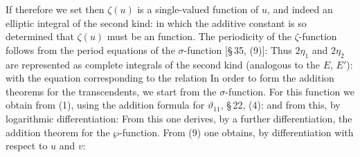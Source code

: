 
If therefore we set
then $\zeta(u)$ is a single-valued function of $u$, and indeed
an elliptic integral of the second kind:
in which the additive constant is so determined that $\zeta(u)$
must be an  function. The periodicity of the $\zeta$-function
follows from the period equations of the $\sigma$-function
[\S\,35, (9)]:
Thus $2\eta_1$ and $2\eta_2$ are represented as complete integrals of the second
kind (analogous to the $E$, $E'$):
with the equation corresponding to the  relation
In order to form the addition theorems for the 
transcendents, we start from the $\sigma$-function.
For this function we obtain from (1), using the addition formula
for $\vartheta_{11}$, \S\,22, (4):
and from this, by logarithmic differentiation:
From this one derives, by a further differentiation, the
addition theorem for the $\wp$-function. From (9) one obtains,
by differentiation with respect to $u$ and $v$:
